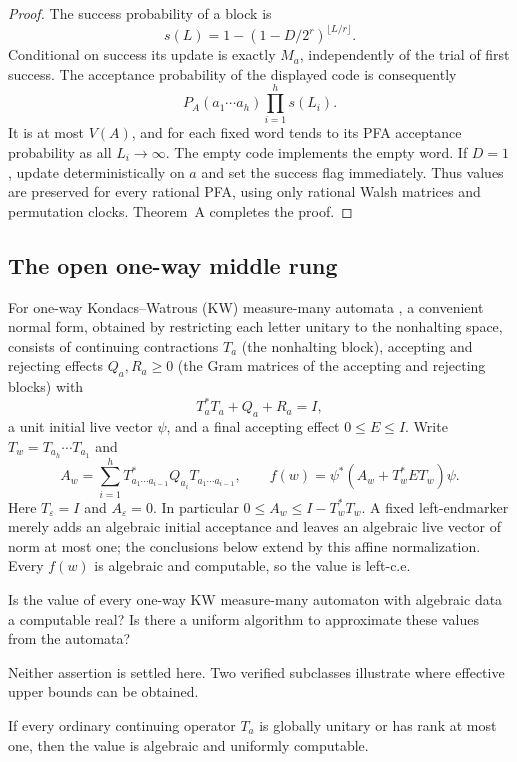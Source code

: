 \documentclass[11pt]{article}
\theoremstyle{plain}
\theoremstyle{definition}
\theoremstyle{remark}
\newcommand{\eps}{\varepsilon}
\begin{document}
\begin{proof}
The success probability of a block is
\[
 s(L)=1-(1-D/2^r)^{\lfloor L/r\rfloor}.
\]
Conditional on success its update is exactly $M_a$, independently of the trial of first success. The acceptance probability of the displayed code is consequently
\begin{equation}\label{eq:qfacl-code}
 P_A(a_1\cdots a_h)\prod_{i=1}^h s(L_i).
\end{equation}
It is at most $V(A)$, and for each fixed word tends to its PFA acceptance probability as all $L_i\to\infty$. The empty code implements the empty word. If $D=1$, update deterministically on $a$ and set the success flag immediately. Thus values are preserved for every rational PFA, using only rational Walsh matrices and permutation clocks. Theorem~A completes the proof.
\end{proof}

\subsection{The open one-way middle rung}

For one-way Kondacs--Watrous (KW) measure-many automata \cite{KW97}, a convenient normal form, obtained by restricting each letter unitary to the nonhalting space, consists of continuing contractions $T_a$ (the nonhalting block), accepting and rejecting effects $Q_a,R_a\ge0$ (the Gram matrices of the accepting and rejecting blocks) with
\[
 T_a^*T_a+Q_a+R_a=I,
\]
a unit initial live vector $\psi$, and a final accepting effect $0\le E\le I$. Write $T_w=T_{a_h}\cdots T_{a_1}$ and
\[
 A_w=\sum_{i=1}^h T_{a_1\cdots a_{i-1}}^*Q_{a_i}T_{a_1\cdots a_{i-1}},\qquad
 f(w)=\psi^*(A_w+T_w^*ET_w)\psi.
\]
Here $T_\eps=I$ and $A_\eps=0$. In particular $0\le A_w\le I-T_w^*T_w$. A fixed left-endmarker merely adds an algebraic initial acceptance and leaves an algebraic live vector of norm at most one; the conclusions below extend by this affine normalization. Every $f(w)$ is algebraic and computable, so the value is left-c.e.

\begin{question}\label{qu:kw}
Is the value of every one-way KW measure-many automaton with algebraic data a computable real? Is there a uniform algorithm to approximate these values from the automata?
\end{question}

Neither assertion is settled here. Two verified subclasses illustrate where effective upper bounds can be obtained.

\begin{proposition}\label{prop:kw-rankone}
If every ordinary continuing operator $T_a$ is globally unitary or has rank at most one, then the value is algebraic and uniformly computable.
\end{proposition}
\end{document}
